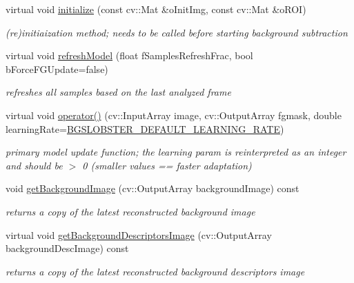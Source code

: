 \begin{DoxyCompactItemize}
virtual void \mbox{\hyperlink{class_background_subtractor_l_o_b_s_t_e_r_a452bea31dcbd2e10efc701cc2cd25776}{initialize}} (const cv\+::\+Mat \&o\+Init\+Img, const cv\+::\+Mat \&o\+R\+OI)
\begin{DoxyCompactList}\small\item\em (re)initiaization method; needs to be called before starting background subtraction \end{DoxyCompactList}\item 
virtual void \mbox{\hyperlink{class_background_subtractor_l_o_b_s_t_e_r_aeb3b23c1f47cfe71a73f3ca47ec06a75}{refresh\+Model}} (float f\+Samples\+Refresh\+Frac, bool b\+Force\+F\+G\+Update=false)
\begin{DoxyCompactList}\small\item\em refreshes all samples based on the last analyzed frame \end{DoxyCompactList}\item 
virtual void \mbox{\hyperlink{class_background_subtractor_l_o_b_s_t_e_r_a0c0faf2754a7a74a6ae56cea47207070}{operator()}} (cv\+::\+Input\+Array image, cv\+::\+Output\+Array fgmask, double learning\+Rate=\mbox{\hyperlink{_background_subtractor_l_o_b_s_t_e_r_8h_a2d317f4a065c4c58c7241080d9c4457c}{B\+G\+S\+L\+O\+B\+S\+T\+E\+R\+\_\+\+D\+E\+F\+A\+U\+L\+T\+\_\+\+L\+E\+A\+R\+N\+I\+N\+G\+\_\+\+R\+A\+TE}})
\begin{DoxyCompactList}\small\item\em primary model update function; the learning param is reinterpreted as an integer and should be $>$ 0 (smaller values == faster adaptation) \end{DoxyCompactList}\item 
void \mbox{\hyperlink{class_background_subtractor_l_o_b_s_t_e_r_a07872de46dbbd970b0bca959f2eb9392}{get\+Background\+Image}} (cv\+::\+Output\+Array background\+Image) const
\begin{DoxyCompactList}\small\item\em returns a copy of the latest reconstructed background image \end{DoxyCompactList}\item 
virtual void \mbox{\hyperlink{class_background_subtractor_l_o_b_s_t_e_r_a28b005819f237ece74ab9eeacef8d770}{get\+Background\+Descriptors\+Image}} (cv\+::\+Output\+Array background\+Desc\+Image) const
\begin{DoxyCompactList}\small\item\em returns a copy of the latest reconstructed background descriptors image \end{DoxyCompactList}\item 

\end{DoxyCompactItemize}
